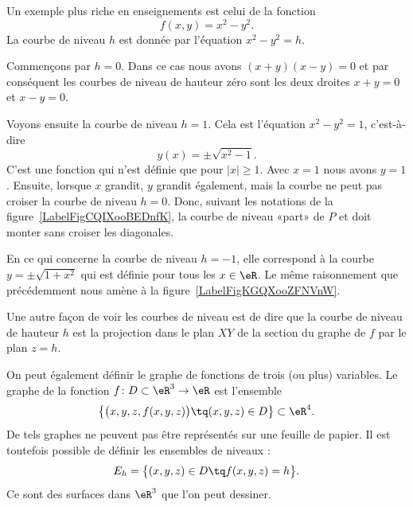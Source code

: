 \begin{example}
	Un exemple plus riche en enseignements est celui de la fonction
	\begin{equation}
		f(x,y)=x^2-y^2.
	\end{equation}
	La courbe de niveau \( h\) est donnée par l'équation \( x^2-y^2=h\).

	Commençons par \( h=0\). Dans ce cas nous avons \( (x+y)(x-y)=0\) et par conséquent les courbes de niveau de hauteur zéro sont les deux droites \( x+y=0\) et \( x-y=0\).

	Voyons ensuite la courbe de niveau \( h=1\). Cela est l'équation \( x^2-y^2=1\), c'est-à-dire
	\begin{equation}
		y(x)=\pm\sqrt{x^2-1}.
	\end{equation}
	C'est une fonction qui n'est définie que pour \( | x |\geq 1\). Avec \( x=1\) nous avons \( y=1\). Ensuite, lorsque \( x\) grandit, \( y\) grandit également, mais la courbe ne peut pas croiser la courbe de niveau \( h=0\). Donc, suivant les notations de la figure~\ref{LabelFigCQIXooBEDnfK}, la courbe de niveau «part» de \( P\) et doit monter sans croiser les diagonales.


	\newcommand{\CaptionFigCQIXooBEDnfK}{La courbe de niveau \( h=1\) de \( x^2-y^2\). Notez qu'elle est en deux morceaux.}
	

	\newcommand{\CaptionFigKGQXooZFNVnW}{La courbe de niveau \( x^2-y^2=-1\).}
	

	En ce qui concerne la courbe de niveau \( h=-1\), elle correspond à la courbe \( y=\pm\sqrt{1+x^2}\) qui est définie pour tous les \( x\in\eR\). Le même raisonnement que précédemment nous amène à la figure~\ref{LabelFigKGQXooZFNVnW}.
\end{example}

Une autre façon de voir les courbes de niveau est de dire que la courbe de niveau de hauteur \( h\) est la projection dans le plan \( XY\) de la section du graphe de \( f\) par le plan \( z=h\).

On peut également définir le graphe de fonctions de trois (ou plus) variables. Le graphe de la fonction \( f\colon D\subset\eR^3\to \eR\) est l'ensemble
\begin{equation}
	\big\{ \big( x,y,z,f(x,y,z) \big)\tq (x,y,z)\in D \big\}\subset \eR^4.
\end{equation}
De tels graphes ne peuvent pas être représentés sur une feuille de papier. Il est toutefois possible de définir les ensembles de niveaux :
\begin{equation}
	E_h=\big\{ (x,y,z)\in D\tq  f(x,y,z)=h\big\}.
\end{equation}
Ce sont des surfaces dans \( \eR^3\) que l'on peut dessiner.

